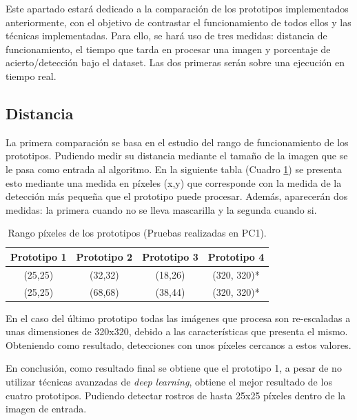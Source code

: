 Este apartado estará dedicado a la comparación de los prototipos implementados anteriormente, con el objetivo de contrastar el funcionamiento de todos ellos y las técnicas implementadas. Para ello, se hará uso de tres medidas: distancia de funcionamiento, el tiempo que tarda en procesar una imagen y porcentaje de acierto/detección bajo el dataset. Las dos primeras serán sobre una ejecución en tiempo real.

\vspace{-0.7cm}
\subsection*{Distancia}
\vspace{-0.5cm}
La primera comparación se basa en el estudio del rango de funcionamiento de los prototipos. Pudiendo medir su distancia mediante el tamaño de la imagen que se le pasa como entrada al algoritmo. En la siguiente tabla (Cuadro \ref{tab:table3}) se presenta esto mediante una medida en píxeles (x,y) que corresponde con la medida de la detección más pequeña que el prototipo puede procesar. Además, aparecerán dos medidas: la primera cuando no se lleva mascarilla y la segunda cuando si.

\begin{table}[h!]
	\begin{center}
		\begin{tabular}{ |c|c|c|c| } 
			\hline
			\textbf{Prototipo 1} & \textbf{Prototipo 2} & \textbf{Prototipo 3} & \textbf{Prototipo 4} \\
			\hline
			(25,25) & (32,32)  & (18,26) & (320, 320)* \\
			(25,25) & (68,68)  & (38,44) & (320, 320)* \\
			\hline
		\end{tabular}
		\caption{Rango píxeles de los prototipos (Pruebas realizadas en PC1).}
		\label{tab:table3}
	\end{center}
\end{table}

En el caso del último prototipo todas las imágenes que procesa son re-escaladas a unas dimensiones de 320x320, debido a las características que presenta el mismo. Obteniendo como resultado, detecciones con unos píxeles cercanos a estos valores.

En conclusión, como resultado final se obtiene que el prototipo 1, a pesar de no utilizar técnicas avanzadas de \textit{deep learning}, obtiene el mejor resultado de los cuatro prototipos. Pudiendo detectar rostros de hasta 25x25 píxeles dentro de la imagen de entrada.

